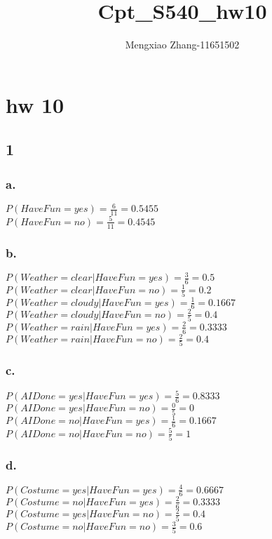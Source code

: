 \documentclass{article}
\author{Mengxiao Zhang-11651502}
\title{Cpt\_S540\_hw10}
\begin{document}
    \maketitle
    \section{hw 10}
        \subsection{1}
            \subsubsection{a.}
                $P(HaveFun=yes)=\frac{6}{11}=0.5455$\\
                $P(HaveFun=no)=\frac{5}{11}=0.4545$
            \subsubsection{b.}
                $P(Weather=clear|HaveFun=yes)=\frac{3}{6}=0.5$\\
                $P(Weather=clear|HaveFun=no)=\frac{1}{5}=0.2$\\
                $P(Weather=cloudy|HaveFun=yes)=\frac{1}{6}=0.1667$\\
                $P(Weather=cloudy|HaveFun=no)=\frac{2}{5}=0.4$\\
                $P(Weather=rain|HaveFun=yes)=\frac{2}{6}=0.3333$\\
                $P(Weather=rain|HaveFun=no)=\frac{2}{5}=0.4$
            \subsubsection{c.}
                $P(AIDone=yes|HaveFun=yes)=\frac{5}{6}=0.8333$\\
                $P(AIDone=yes|HaveFun=no)=\frac{0}{5}=0$\\
                $P(AIDone=no|HaveFun=yes)=\frac{1}{6}=0.1667$\\
                $P(AIDone=no|HaveFun=no)=\frac{5}{5}=1$
            \subsubsection{d.}
                $P(Costume=yes|HaveFun=yes)=\frac{4}{6}=0.6667$\\
                $P(Costume=no|HaveFun=yes)=\frac{2}{6}=0.3333$\\
                $P(Costume=yes|HaveFun=no)=\frac{2}{5}=0.4$\\
                $P(Costume=no|HaveFun=no)=\frac{3}{5}=0.6$
\end{document}

